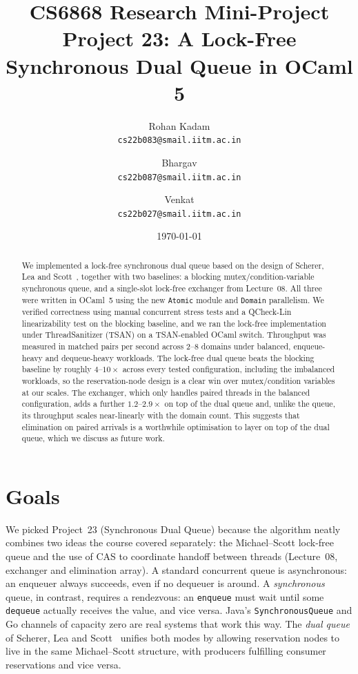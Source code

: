 \documentclass[11pt,a4paper]{article}
\title{%
  \textbf{CS6868 Research Mini-Project} \\[0.3em]
  \Large Project 23: A Lock-Free Synchronous Dual Queue in OCaml 5%
}
\author{%
  Rohan Kadam \\ \texttt{cs22b083@smail.iitm.ac.in}
  \and
  Bhargav \\ \texttt{cs22b087@smail.iitm.ac.in}
  \and
  Venkat \\ \texttt{cs22b027@smail.iitm.ac.in}
}
\date{\today}
\begin{document}
\maketitle

\begin{abstract}
We implemented a lock-free synchronous dual queue based on the design of
Scherer, Lea and Scott~\cite{scherer2009synchronous}, together with two
baselines: a blocking mutex/condition-variable synchronous queue, and a
single-slot lock-free exchanger from Lecture~08. All three were written in
OCaml~5 using the new \texttt{Atomic} module and \texttt{Domain} parallelism.
We verified correctness using manual concurrent stress tests and a
QCheck-Lin linearizability test on the blocking baseline, and we ran the
lock-free implementation under ThreadSanitizer (TSAN) on a TSAN-enabled
OCaml switch. Throughput was measured in matched pairs per second across
2--8 domains under balanced, enqueue-heavy and dequeue-heavy workloads.
The lock-free dual queue beats the blocking baseline by roughly
$4$--$10\times$ across every tested configuration, including the
imbalanced workloads, so the reservation-node design is a clear win
over mutex/condition variables at our scales. The exchanger, which
only handles paired threads in the balanced configuration, adds a
further $1.2$--$2.9\times$ on top of the dual queue and, unlike the
queue, its throughput scales near-linearly with the domain count.
This suggests that elimination on paired arrivals is a worthwhile
optimisation to layer on top of the dual queue, which we discuss as
future work.
\end{abstract}

\section{Goals}
\label{sec:goals}

We picked Project~23 (Synchronous Dual Queue) because the algorithm
neatly combines two ideas the course covered separately: the
Michael--Scott lock-free queue and the use of CAS
to coordinate handoff between threads (Lecture~08, exchanger and
elimination array). A standard concurrent queue is asynchronous: an
enqueuer always succeeds, even if no dequeuer is around. A
\emph{synchronous} queue, in contrast, requires a rendezvous: an
\texttt{enqueue} must wait until some \texttt{dequeue} actually receives
the value, and vice versa. Java's \texttt{SynchronousQueue} and Go
channels of capacity zero are real systems that work this way. The
\emph{dual queue} of Scherer, Lea and Scott~\cite{scherer2009synchronous}
unifies both modes by allowing reservation nodes to live in the same
Michael--Scott structure, with producers fulfilling consumer reservations
and vice versa.
\end{document}
